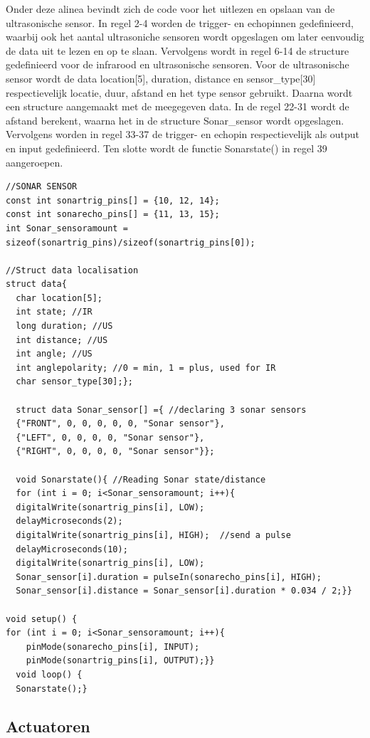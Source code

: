Onder deze alinea bevindt zich de code voor het uitlezen en opslaan van de ultrasonische sensor. In regel 2-4 worden de trigger- en echopinnen gedefinieerd, waarbij ook het aantal ultrasoniche sensoren wordt opgeslagen om later eenvoudig de data uit te lezen en op te slaan. Vervolgens wordt in regel 6-14 de structure gedefinieerd voor de infrarood en ultrasonische sensoren. Voor de ultrasonische sensor wordt de data location[5], duration, distance en sensor\_type[30] respectievelijk locatie, duur, afstand en het type sensor gebruikt. Daarna wordt een structure aangemaakt met de meegegeven data. In de regel 22-31 wordt de afstand berekent, waarna het in de structure Sonar\_sensor wordt opgeslagen. Vervolgens worden in regel 33-37 de trigger- en echopin respectievelijk als output en input gedefinieerd. Ten slotte wordt de functie Sonarstate() in regel 39  aangeroepen.
\begin{lstlisting}
//SONAR SENSOR
const int sonartrig_pins[] = {10, 12, 14};
const int sonarecho_pins[] = {11, 13, 15};
int Sonar_sensoramount = sizeof(sonartrig_pins)/sizeof(sonartrig_pins[0]);

//Struct data localisation
struct data{
  char location[5];
  int state; //IR
  long duration; //US
  int distance; //US
  int angle; //US
  int anglepolarity; //0 = min, 1 = plus, used for IR
  char sensor_type[30];};
  
  struct data Sonar_sensor[] ={ //declaring 3 sonar sensors 
  {"FRONT", 0, 0, 0, 0, 0, "Sonar sensor"},
  {"LEFT", 0, 0, 0, 0, "Sonar sensor"},
  {"RIGHT", 0, 0, 0, 0, "Sonar sensor"}};
  
  void Sonarstate(){ //Reading Sonar state/distance
  for (int i = 0; i<Sonar_sensoramount; i++){
  digitalWrite(sonartrig_pins[i], LOW); 
  delayMicroseconds(2);
  digitalWrite(sonartrig_pins[i], HIGH);  //send a pulse
  delayMicroseconds(10);
  digitalWrite(sonartrig_pins[i], LOW); 
  Sonar_sensor[i].duration = pulseIn(sonarecho_pins[i], HIGH);
  Sonar_sensor[i].distance = Sonar_sensor[i].duration * 0.034 / 2;}}
  
void setup() {
for (int i = 0; i<Sonar_sensoramount; i++){
    pinMode(sonarecho_pins[i], INPUT);
    pinMode(sonartrig_pins[i], OUTPUT);}}
  void loop() {
  Sonarstate();}

\end{lstlisting}

\subsection{Actuatoren}
